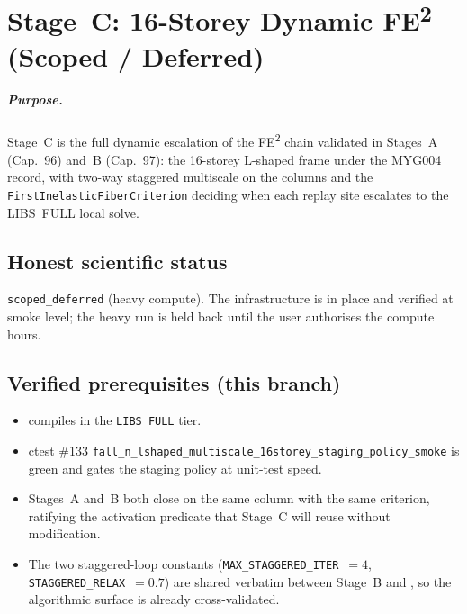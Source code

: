 
\chapter{Stage~C: 16-Storey Dynamic FE\textsuperscript{2} (Scoped / Deferred)}
\label{ch:fe2-16storey-dynamic}

\paragraph{Purpose.}
Stage~C is the full dynamic escalation of the FE\textsuperscript{2}
chain validated in Stages~A (Cap.~96) and~B (Cap.~97): the 16-storey
L-shaped frame under the MYG004 record, with two-way staggered
multiscale on the columns and the \texttt{FirstInelasticFiberCriterion}
deciding when each replay site escalates to the LIBS~FULL local solve.

\section{Honest scientific status}

\texttt{scoped\_deferred} (heavy compute). The infrastructure is in
place and verified at smoke level; the heavy run is held back until the
user authorises the compute hours.

\section{Verified prerequisites (this branch)}

\begin{itemize}
  \item {} compiles in the
        \texttt{LIBS FULL} tier.
  \item ctest \#133
        \texttt{fall\_n\_lshaped\_multiscale\_16storey\_staging\_policy\_smoke}
        is green and gates the staging policy at unit-test speed.
  \item Stages~A and~B both close on the same column with the same
        criterion, ratifying the activation predicate that Stage~C
        will reuse without modification.
  \item The two staggered-loop constants
        (\texttt{MAX\_STAGGERED\_ITER}~$= 4$,
         \texttt{STAGGERED\_RELAX}~$= 0.7$) are shared verbatim between
        Stage~B and , so the
        algorithmic surface is already cross-validated.
\end{itemize}

